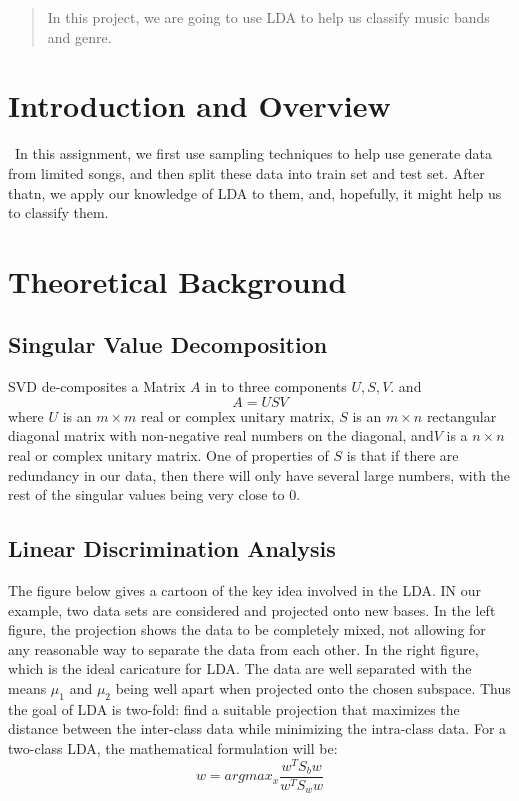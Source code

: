 \documentclass[12pt]{article}
\begin{document}
\maketitle

\begin{abstract}
In this project, we are going to use LDA to help us classify music bands and genre.
\end{abstract}

\section{Introduction and Overview}\
In this assignment, we first use sampling techniques to help use generate data from limited songs, and then split these data into train set and test set. After thatn, we apply our knowledge of LDA to them, and, hopefully, it might help us to classify them.
\section{Theoretical Background}
\subsection{Singular Value Decomposition}
SVD de-composites a Matrix $A$ in to three components $U, S, V$. and
\[A = USV\]
where $U$  is an $ m\times m$ real or complex unitary matrix, $S$ is an $ m\times n$ rectangular diagonal matrix with non-negative real numbers on the diagonal, and$V$ is a $ n\times n$ real or complex unitary matrix.
One of properties of $S$ is that if there are redundancy in our data, then there will only have several large numbers, with the rest of the singular values being very close to 0.
\subsection{Linear Discrimination Analysis}
The figure below gives a cartoon of the key idea involved in the LDA. IN our example, two data sets are considered and projected onto new bases. In the left figure, the projection shows the data to be completely mixed, not allowing for any reasonable way to separate the data from each other. In the right figure, which is the ideal caricature for LDA. The data are well separated with the means $\mu_1$ and $\mu_2$ being well apart when projected onto the chosen subspace. Thus the goal of LDA is two-fold: find a suitable projection that maximizes the distance between the inter-class data while minimizing the intra-class data.
For a two-class LDA, the mathematical formulation will be:
	\[w = argmax_x \frac{w^TS_bw}{w^TS_ww}\]
	
\end{document}
